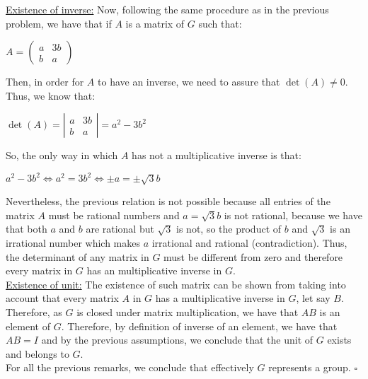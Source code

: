 \documentclass[a4paper,openany,11pt]{book}
\begin{document}
\underline{Existence of inverse:} Now, following the same procedure as in the previous problem, we have that if $A$ is a matrix of $G$ such that:

\begin{center}
	$A = \left(\begin{array}{cc}
	a & 3b\\
	b & a
	\end{array}\right)$
\end{center}

Then, in order for $A$ to have an inverse, we need to assure that $\det(A) \neq 0$. Thus, we know that:

\begin{center}
	$\det(A) = \left|\begin{array}{cc}
	a & 3b\\
	b & a
	\end{array}\right| = a^{2} - 3b^{2}$
\end{center}

So, the only way in which $A$ has not a multiplicative inverse is that:

\begin{center}
	$a^{2}-3b^{2} \iff a^{2} = 3b^{2} \iff \pm a = \pm \sqrt{3}b$
\end{center}

Nevertheless, the previous relation is not possible because all entries of the matrix $A$ must be rational numbers and $a = \sqrt{3}b$ is not rational, because we have that both $a$ and $b$ are rational but $\sqrt{3}$ is not, so the product of $b$ and $\sqrt{3}$ is an irrational number which makes $a$ irrational and rational (contradiction). Thus, the determinant of any matrix in $G$ must be different from zero and therefore every matrix in $G$ has an multiplicative inverse in $G$.\\

\underline{Existence of unit:} The existence of such matrix can be shown from taking into account that every matrix $A$ in $G$ has a multiplicative inverse in $G$, let say $B$. Therefore, as $G$ is closed under matrix multiplication, we have that $AB$ is an element of $G$. Therefore, by definition of inverse of an element, we have that $AB = I$ and by the previous assumptions, we conclude that the unit of $G$ exists and belongs to $G$.\\

For all the previous remarks, we conclude that effectively $G$ represents a group. \hspace{0.1cm} $\square$ 
\end{document}
